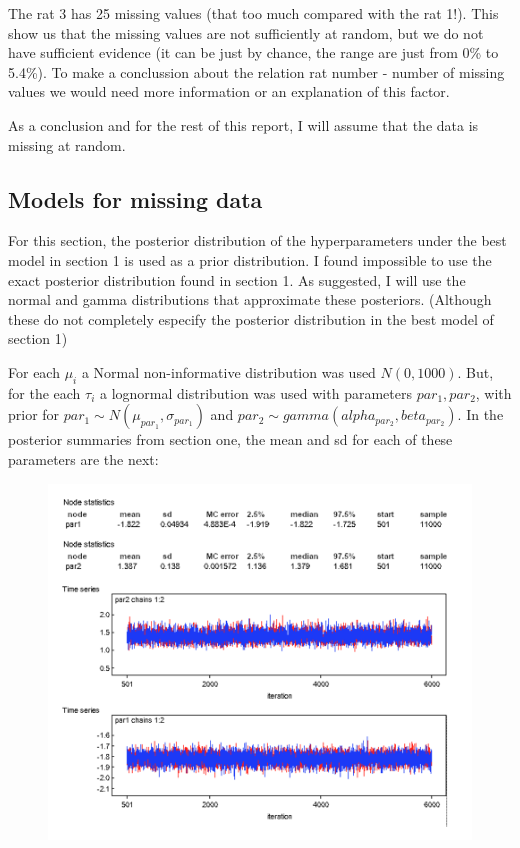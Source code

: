 \documentclass{article}
\begin{document}
The rat 3 has 25 missing values (that too much compared with the rat 1!). This show us that the missing values are not sufficiently at random, but we do not have sufficient evidence (it can be just by chance, the range are just from 0\% to 5.4\%). To make a conclussion about the relation rat number - number of missing values we would need more information or an explanation of this factor. 

As a conclusion and for the rest of this report, I will assume that the data is missing at random. 

\subsection*{Models for missing data}
For this section, the posterior distribution of the hyperparameters under the best model in section 1 is used as a prior distribution. I found impossible to use the exact posterior distribution found in section 1. As suggested, I will use the normal and gamma distributions that approximate these posteriors. (Although these do not completely especify the posterior distribution in the best model of section 1)

For each $\mu_i$ a Normal non-informative distribution was used $N(0, 1000)$. But, for the each $\tau_i$ a lognormal distribution was used with parameters $par_1, par_2$, with prior for $par_1 \sim N(\mu_{par_1}, \sigma_{par_1})$ and $par_2 \sim gamma(alpha_{par_2}, beta_{par_2})$. In the posterior summaries from section one, the mean and sd for each of these parameters are the next:

\begin{figure}[ht!]
\centering
\includegraphics[width=16cm]{figures/model3_tau3_hyperpars.png}
\end{figure}
\end{document}
